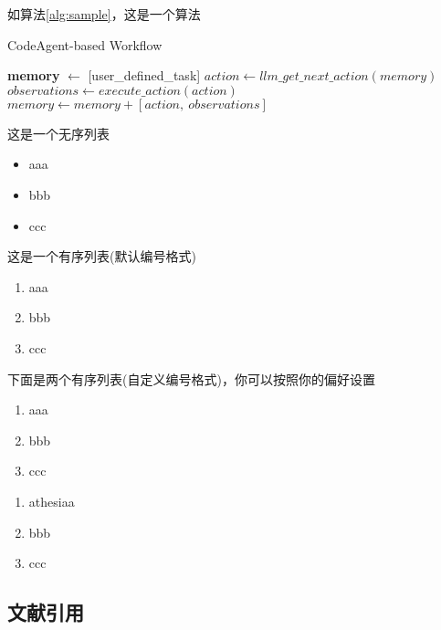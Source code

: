 \par 如算法\ref{alg:sample}，这是一个算法

\begin{algorithm}[ht]
	\caption{CodeAgent-based Workflow}
	\label{alg:sample}
	\begin{algorithmic}
		\State \textbf{memory} $\gets$ [user\_defined\_task]
		\State $action \gets llm\_get\_next\_action(memory)$
		\State $observations \gets execute\_action(action)$
		\State $memory \gets memory + [action,\ observations]$
		\EndWhile
	\end{algorithmic}
\end{algorithm}

\par 这是一个无序列表

\begin{itemize}
    \item aaa
    \item bbb
    \item ccc
\end{itemize}

\par 这是一个有序列表(默认编号格式)

\begin{enumerate}
    \item aaa
    \item bbb
    \item ccc
\end{enumerate}

\par 下面是两个有序列表(自定义编号格式)，你可以按照你的偏好设置

\begin{enumerate}[label=\arabic*)]	
    \item aaa
    \item bbb
    \item ccc
\end{enumerate}

\noindent\hrulefill

\begin{enumerate}[label=(\alph*)]
    \item athesiaa
    \item bbb
    \item ccc
\end{enumerate}

\subsection{文献引用}

